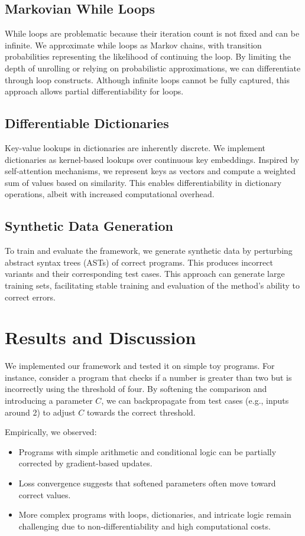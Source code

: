 \documentclass{article}
\begin{document}
\subsection{Markovian While Loops}
While loops are problematic because their iteration count is not fixed and can be infinite. We approximate while loops as Markov chains, with transition probabilities representing the likelihood of continuing the loop. By limiting the depth of unrolling or relying on probabilistic approximations, we can differentiate through loop constructs. Although infinite loops cannot be fully captured, this approach allows partial differentiability for loops.

\subsection{Differentiable Dictionaries}
Key-value lookups in dictionaries are inherently discrete. We implement dictionaries as kernel-based lookups over continuous key embeddings. Inspired by self-attention mechanisms, we represent keys as vectors and compute a weighted sum of values based on similarity. This enables differentiability in dictionary operations, albeit with increased computational overhead.

\subsection{Synthetic Data Generation}
To train and evaluate the framework, we generate synthetic data by perturbing abstract syntax trees (ASTs) of correct programs. This produces incorrect variants and their corresponding test cases. This approach can generate large training sets, facilitating stable training and evaluation of the method’s ability to correct errors.

\section{Results and Discussion}
We implemented our framework and tested it on simple toy programs. For instance, consider a program that checks if a number is greater than two but is incorrectly using the threshold of four. By softening the comparison and introducing a parameter $C$, we can backpropagate from test cases (e.g., inputs around 2) to adjust $C$ towards the correct threshold.

Empirically, we observed:
\begin{itemize}
    \item Programs with simple arithmetic and conditional logic can be partially corrected by gradient-based updates.
    \item Loss convergence suggests that softened parameters often move toward correct values.
    \item More complex programs with loops, dictionaries, and intricate logic remain challenging due to non-differentiability and high computational costs.
\end{itemize}
\end{document}
